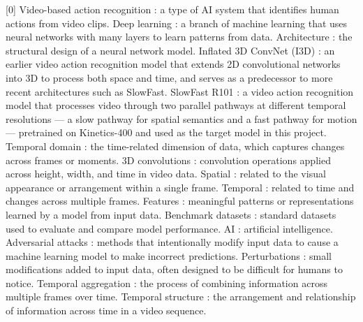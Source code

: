 [0] Video-based action recognition : a type of AI system that identifies human actions from video clips. \newline
[1] Deep learning : a branch of machine learning that uses neural networks with many layers to learn patterns from data. \newline
[2] Architecture : the structural design of a neural network model. \newline
[3] Inflated 3D ConvNet (I3D) : an earlier video action recognition model that extends 2D convolutional networks into 3D to process both space and time, and serves as a predecessor to more recent architectures such as SlowFast. \newline
[3b] SlowFast R101 : a video action recognition model that processes video through two parallel pathways at different temporal resolutions — a slow pathway for spatial semantics and a fast pathway for motion — pretrained on Kinetics-400 and used as the target model in this project. \newline
[4] Temporal domain : the time-related dimension of data, which captures changes across frames or moments. \newline
[5] 3D convolutions : convolution operations applied across height, width, and time in video data. \newline
[6] Spatial : related to the visual appearance or arrangement within a single frame. \newline
[7] Temporal : related to time and changes across multiple frames. \newline
[8] Features : meaningful patterns or representations learned by a model from input data. \newline
[9] Benchmark datasets : standard datasets used to evaluate and compare model performance. \newline
[10] AI : artificial intelligence. \newline
[11] Adversarial attacks : methods that intentionally modify input data to cause a machine learning model to make incorrect predictions. \newline
[12] Perturbations : small modifications added to input data, often designed to be difficult for humans to notice. \newline
[13] Temporal aggregation : the process of combining information across multiple frames over time. \newline
[14] Temporal structure : the arrangement and relationship of information across time in a video sequence. \newline
